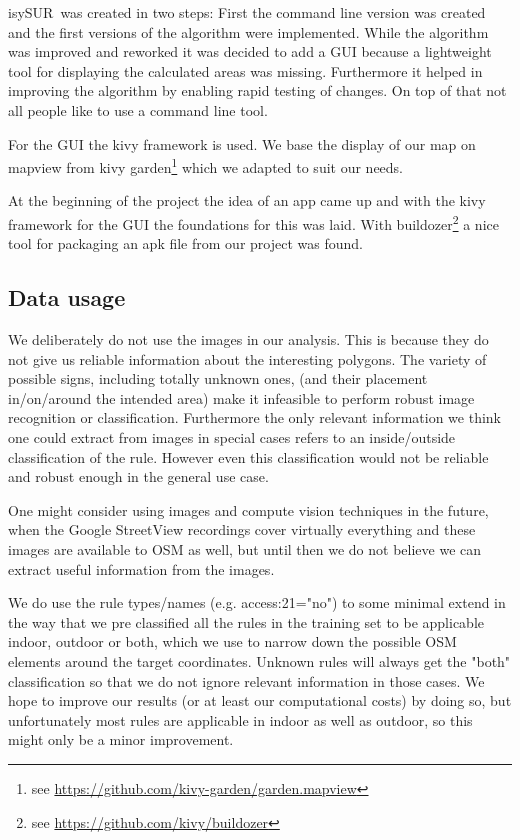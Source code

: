 \documentclass[11pt,fleqn]{book} %
\newcommand{\ProjectTitle}{isySUR}
\newcommand{\pt}{\ProjectTitle}
\begin{document}
\pt\ was created in two steps: First the command line version was created and the first versions of the algorithm were implemented. While the algorithm was improved and reworked it was decided to add a GUI because a lightweight tool for displaying the calculated areas was missing. Furthermore it helped in improving the algorithm by enabling rapid testing of changes. On top of that not all people like to use a command line tool.

For the GUI the kivy framework is used. We base the display of our map on mapview from kivy garden\footnote{see \url{https://github.com/kivy-garden/garden.mapview}} which we adapted to suit our needs.

At the beginning of the project the idea of an app came up and with the kivy framework for the GUI the foundations for this was laid. With buildozer\footnote{see \url{https://github.com/kivy/buildozer}} a nice tool for packaging an apk file from our project was found.

\subsection{Data usage}\label{sec:config}
We deliberately do not use the images in our analysis. This is because they do not give us reliable information about the interesting polygons. The variety of possible signs, including totally unknown ones, (and their placement in/on/around the intended area) make it infeasible to perform robust image recognition or classification. Furthermore the only relevant information we think one could extract from images in special cases refers to an inside/outside classification of the rule. However even this classification would not be reliable and robust enough in the general use case.

One might consider using images and compute vision techniques in the future, when the Google StreetView recordings cover virtually everything and these images are available to OSM as well, but until then we do not believe we can extract useful information from the images.

We do use the rule types/names (e.g. access:21="no") to some minimal extend in the way that we pre classified all the rules in the training set to be applicable indoor, outdoor or both, which we use to narrow down the possible OSM elements around the target coordinates. Unknown rules will always get the "both" classification so that we do not ignore relevant information in those cases. We hope to improve our results (or at least our computational costs) by doing so, but unfortunately most rules are applicable in indoor as well as outdoor, so this might only be a minor improvement.
\end{document}
